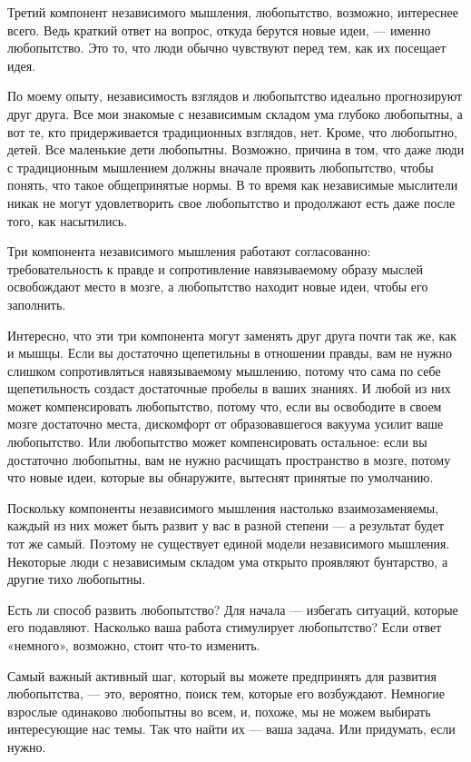 \documentclass[ebook,12pt,oneside,openany]{memoir}
\begin{document}
Третий компонент независимого мышления, любопытство, возможно,
интереснее всего. Ведь краткий ответ на вопрос, откуда берутся новые
идеи, — именно любопытство. Это то, что люди обычно чувствуют перед
тем, как их посещает идея.

По моему опыту, независимость взглядов и любопытство идеально
прогнозируют друг друга. Все мои знакомые с независимым складом ума
глубоко любопытны, а вот те, кто придерживается традиционных взглядов,
нет. Кроме, что любопытно, детей. Все маленькие дети любопытны.
Возможно, причина в том, что даже люди с традиционным мышлением должны
вначале проявить любопытство, чтобы понять, что такое общепринятые
нормы. В то время как независимые мыслители никак не могут
удовлетворить свое любопытство и продолжают есть даже после того, как
насытились.

Три компонента независимого мышления работают согласованно:
требовательность к правде и сопротивление навязываемому образу мыслей
освобождают место в мозге, а любопытство находит новые идеи, чтобы его
заполнить.

Интересно, что эти три компонента могут заменять друг друга почти так
же, как и мышцы. Если вы достаточно щепетильны в отношении правды, вам
не нужно слишком сопротивляться навязываемому мышлению, потому что
сама по себе щепетильность создаст достаточные пробелы в ваших
знаниях. И любой из них может компенсировать любопытство, потому что,
если вы освободите в своем мозге достаточно места, дискомфорт от
образовавшегося вакуума усилит ваше любопытство. Или любопытство может
компенсировать остальное: если вы достаточно любопытны, вам не нужно
расчищать пространство в мозге, потому что новые идеи, которые вы
обнаружите, вытеснят принятые по умолчанию.

Поскольку компоненты независимого мышления настолько взаимозаменяемы,
каждый из них может быть развит у вас в разной степени — а результат
будет тот же самый. Поэтому не существует единой модели независимого
мышления. Некоторые люди с независимым складом ума открыто проявляют
бунтарство, а другие тихо любопытны.

Есть ли способ развить любопытство? Для начала — избегать ситуаций,
которые его подавляют. Насколько ваша работа стимулирует любопытство?
Если ответ «немного», возможно, стоит что-то изменить.

Самый важный активный шаг, который вы можете предпринять для развития
любопытства, — это, вероятно, поиск тем, которые его возбуждают.
Немногие взрослые одинаково любопытны во всем, и, похоже, мы не можем
выбирать интересующие нас темы. Так что найти их — ваша задача. Или
придумать, если нужно.
\end{document}

